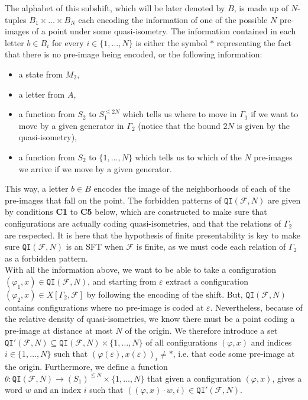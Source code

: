 \documentclass{article}
\theoremstyle{definition}
\theoremstyle{definition}
\newcommand{\Fo}{\mathcal{F}}
\newcommand{\QI}{\mathtt{QI}}
\begin{document}
The alphabet of this subshift, which will be later denoted by $B$, is made up of $N$-tuples $B_1\times\dots\times B_N$ each encoding the information of one of the possible $N$ pre-images of a point under some quasi-isometry. The information contained in each letter $b\in B_i$ for every $i\in\{1,\dots, N\}$ is either the symbol $*$ representing the fact that there is no pre-image being encoded, or the following information:
\begin{itemize}
    \item a state from $M_2$,
    \item a letter from $A$,
    \item a function from $S_2$ to $S_1^{\leq2N}$ which tells us where to move in $\Gamma_1$ if we want to move by a given generator in $\Gamma_2$ (notice that the bound $2N$ is given by the quasi-isometry),
    \item a function from $S_2$ to $\{1,\dots, N\}$ which tells us to which of the $N$ pre-images we arrive if we move by a given generator.
\end{itemize}
This way, a letter $b\in B$ encodes the image of the neighborhoods of each of the pre-images that fall on the point. The forbidden patterns of $\QI(\Fo,N)$ are given by conditions \textbf{C1} to \textbf{C5} below, which are constructed to make sure that configurations are actually coding quasi-isometries, and that the relations of $\Gamma_2$ are respected. It is here that the hypothesis of finite presentability is key to make sure $\QI(\Fo, N)$ is an SFT when $\Fo$ is finite, as we must code each relation of $\Gamma_2$ as a forbidden pattern.\\

With all the information above, we want to be able to take a configuration $(\varphi_1, x)\in \QI(\Fo, N)$, and starting from $\varepsilon$ extract a configuration $(\varphi_2, x)\in X[\Gamma_2, \Fo]$ by following the encoding of the shift. But, $\QI(\Fo, N)$ contains configurations where no pre-image is coded at $\varepsilon$. Nevertheless, because of the relative density of quasi-isometries, we know there must be a point coding a pre-image at distance at most $N$ of the origin. We therefore introduce a set $\QI'(\Fo,N)\subseteq \QI(\Fo,N)\times \{1,\dots,N\}$ of all configurations $(\varphi, x)$ and indices $i\in \{1,\dots,N\}$ such that $(\varphi(\varepsilon), x(\varepsilon))_i\neq *$, i.e. that code some pre-image at the origin. Furthermore, we define a function $\theta\colon\QI(\Fo, N)\to (S_1)^{\leq N}\times \{1,\dots,N\}$ that given a configuration $(\varphi, x)$, gives a word $w$ and an index $i$ such that $((\varphi,x)\cdot w, i)\in\QI'(\Fo, N)$.
\end{document}
